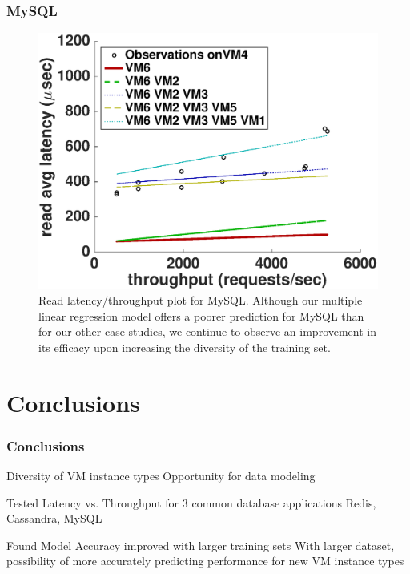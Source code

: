\documentclass{beamer}
\begin{document}
\begin{frame}
\frametitle{MySQL}
  \begin{figure}
    \centering
    \includegraphics[scale = 0.3]{mysql_fit_read_avg_latency.eps}
    \caption{Read latency/throughput plot for MySQL. Although our multiple linear regression model offers a poorer prediction for MySQL than for our other case studies, we continue to observe an improvement in its efficacy upon increasing the diversity of the training set. }
    \label{figure:mysql}
  \end{figure}
\end{frame}

\section{Conclusions}

\begin{frame}
\frametitle{Conclusions}
\begin{block}{Diversity of VM instance types}
Opportunity for data modeling
\end{block}
\begin{block}{Tested Latency vs. Throughput for 3 common database applications}
Redis, Cassandra, MySQL
\end{block}
\begin{block}{Found Model Accuracy improved with larger training sets}
With larger dataset, possibility of more accurately predicting performance for new VM instance types
\end{block}
\end{frame}
\end{document}
